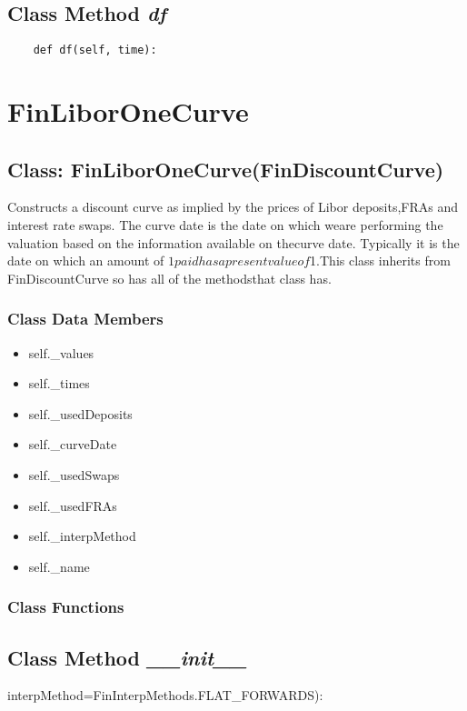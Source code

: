 \documentclass[twoside,11pt]{book}
\begin{document}
\subsection{Class Method {\it df}}


\begin{lstlisting}
    def df(self, time):
\end{lstlisting}

\newpage
\section{FinLiborOneCurve}

\subsection{Class: FinLiborOneCurve(FinDiscountCurve)}
Constructs a discount curve as implied by the prices of Libor deposits,FRAs and interest rate swaps. The curve date is the date on which weare performing the valuation based on the information available on thecurve date. Typically it is the date on which an amount of $1 paidhas a present value of $1.This class inherits from FinDiscountCurve so has all of the methodsthat class has. 

\subsubsection{Class Data Members}
\begin{itemize}
\item{self.\_values}
\item{self.\_times}
\item{self.\_usedDeposits}
\item{self.\_curveDate}
\item{self.\_usedSwaps}
\item{self.\_usedFRAs}
\item{self.\_interpMethod}
\item{self.\_name}
\end{itemize}

\subsubsection{Class Functions}

\subsection{Class Method {\it \_\_init\_\_}}
interpMethod=FinInterpMethods.FLAT\_FORWARDS):
\end{document}
